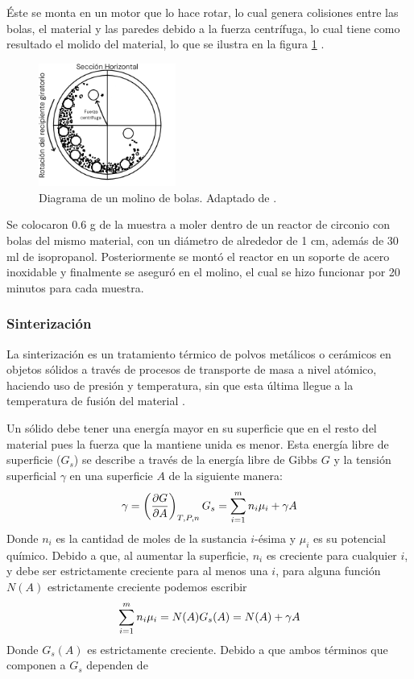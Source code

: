 \documentclass[../main.tex]{subfiles}
\begin{document}
Éste se monta en un motor que lo hace rotar, lo cual genera colisiones entre las bolas, el material y las paredes debido a la fuerza centrífuga, lo cual tiene como resultado el molido del material, lo que se ilustra en la figura \ref{fig:molinodiag} \cite{Baheti2012}.
\begin{figure}[H]
    \centering
    \includegraphics[width=0.4\textwidth]{fig/molinodiag.png}
    \caption{Diagrama de un molino de bolas. Adaptado de \cite{Baheti2012}.}
    \label{fig:molinodiag}
\end{figure}
Se colocaron 0.6 g de la muestra a moler dentro de un reactor de circonio con bolas del mismo material, con un diámetro de alrededor de 1 cm, además de 30 ml de isopropanol. Posteriormente se montó el reactor en un soporte de acero inoxidable y finalmente se aseguró en el molino, el cual se hizo funcionar por 20 minutos para cada muestra.

\subsubsection{Sinterización} \label{sec:sinter}
La sinterización es un tratamiento térmico de polvos metálicos o cerámicos en objetos sólidos a través de procesos de transporte de masa a nivel atómico, haciendo uso de presión y temperatura, sin que esta última llegue a la temperatura de fusión del material \cite{Banerjee2019}.

Un sólido debe tener una energía mayor en su superficie que en el resto del material pues la fuerza que la mantiene unida es menor. Esta energía libre de superficie ($G_s$) se describe a través de la energía libre de Gibbs $G$ y la tensión superficial $\gamma$ en una superficie $A$ de la siguiente manera:
\begin{equation}
    \gamma=\left(\dfrac{\partial G}{\partial A}\right)_{T,P,n}\\
    G_s=\sum_{i=1}^{m} n_i \mu_i + \gamma A
    \label{eq:energiasuperficie}
\end{equation}
Donde $n_i$ es la cantidad de moles de la sustancia $i$-ésima y $\mu_i$ es su potencial químico. Debido a que, al aumentar la superficie, $n_i$ es creciente para cualquier $i$, y debe ser estrictamente creciente para al menos una $i$, para alguna función $N(A)$ estrictamente creciente podemos escribir
\begin{equation}
    \sum_{i=1}^{m} n_i \mu_i = N(A)\\
    G_s(A)=N(A)+\gamma A
    \label{eq:energiasuperficiedepA}
\end{equation}
Donde $G_s(A)$ es estrictamente creciente. Debido a que ambos términos que componen a $G_s$ dependen de
\end{document}
